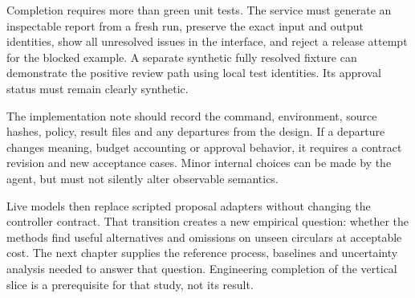 Completion requires more than green unit tests. The service must generate an
inspectable report from a fresh run, preserve the exact input and output identities,
show all unresolved issues in the interface, and reject a release attempt for the
blocked example. A separate synthetic fully resolved fixture can demonstrate the
positive review path using local test identities. Its approval status must remain
clearly synthetic.


The implementation note should record the command, environment, source hashes,
policy, result files and any departures from the design. If a departure changes
meaning, budget accounting or approval behavior, it requires a contract revision
and new acceptance cases. Minor internal choices can be made by the agent, but
must not silently alter observable semantics.

Live models then replace scripted proposal adapters without changing the controller
contract. That transition creates a new empirical question: whether the methods
find useful alternatives and omissions on unseen circulars at acceptable cost.
The next chapter supplies the reference process, baselines and uncertainty
analysis needed to answer that question. Engineering completion of the vertical
slice is a prerequisite for that study, not its result.

